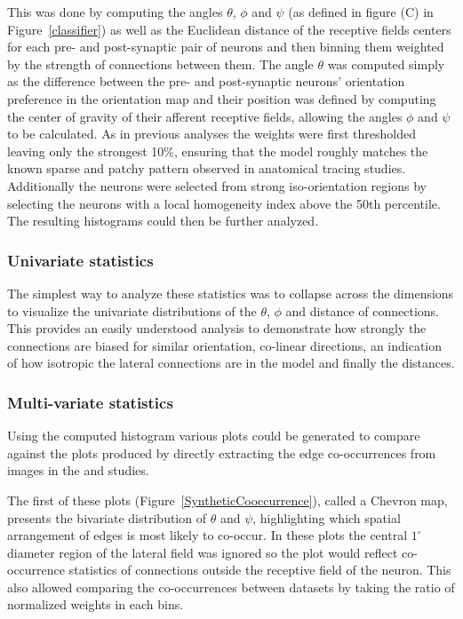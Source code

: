 This was done by computing the angles $\theta$, $\phi$ and $\psi$ (as
defined in figure (C) in Figure~\ref{classifier}) as well as the
Euclidean distance of the receptive fields centers for each pre- and
post-synaptic pair of neurons and then binning them weighted by the
strength of connections between them. The angle $\theta$ was computed
simply as the difference between the pre- and post-synaptic neurons'
orientation preference in the orientation map and their position was
defined by computing the center of gravity of their afferent receptive
fields, allowing the angles $\phi$ and $\psi$ to be calculated. As in
previous analyses the weights were first thresholded leaving only the
strongest 10\%, ensuring that the model roughly matches the known
sparse and patchy pattern observed in anatomical tracing
studies. Additionally the neurons were selected from strong
iso-orientation regions by selecting the neurons with a local
homogeneity index above the 50th percentile. The resulting histograms
could then be further analyzed.

\subsubsection{Univariate statistics}

The simplest way to analyze these statistics was to collapse across
the dimensions to visualize the univariate distributions of the
$\theta$, $\phi$ and distance of connections. This provides an easily
understood analysis to demonstrate how strongly the connections are
biased for similar orientation, co-linear directions, an indication of
how isotropic the lateral connections are in the model and finally the
distances.

\subsubsection{Multi-variate statistics}

Using the computed histogram various plots could be generated to
compare against the plots produced by directly extracting the edge
co-occurrences from images in the \cite{Perrinet2015} and
\cite{Geisler2001} studies.

The first of these plots (Figure~\ref{SyntheticCooccurrence}), called
a Chevron map, presents the bivariate distribution of $\theta$ and
$\psi$, highlighting which spatial arrangement of edges is most likely
to co-occur. In these plots the central $1^\circ$ diameter region of
the lateral field was ignored so the plot would reflect co-occurrence
statistics of connections outside the receptive field of the
neuron. This also allowed comparing the co-occurrences between
datasets by taking the ratio of normalized weights in each bins.

